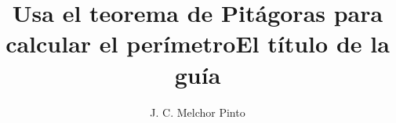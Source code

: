 \documentclass[12pt,addpoints,answers]{guia}
\title{Usa el teorema de Pitágoras para calcular el perímetro}
\title{El título de la guía}
\author{J. C. Melchor Pinto}
\begin{document}
\pagestyle{headandfoot}

\INFO
\vspace{-0.5cm}
\begin{multicols}{2}
    
    
    
    \columnbreak
    
    
\end{multicols}
\begin{questions}
    \questionboxed[10]{}
    \questionboxed[10]{}
    \questionboxed[10]{}
    \questionboxed[10]{}
    \questionboxed[10]{}
    \questionboxed[10]{}
    \questionboxed[10]{}
    \questionboxed[10]{}
    \questionboxed[10]{}
    \questionboxed[10]{}
\end{questions}
\end{document}

